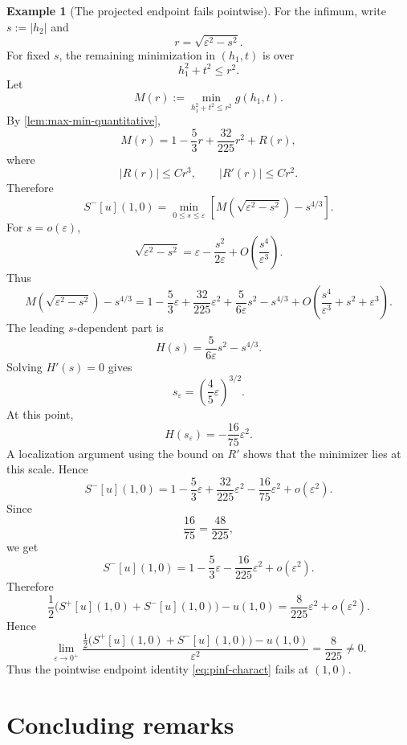 \documentclass[12pt,reqno]{amsart}
\numberwithin{equation}{section}
\theoremstyle{plain}
\theoremstyle{definition}
\newtheorem{example}[example]{Example}
\theoremstyle{remark}
\newcommand{\Sp}{S^+}
\newcommand{\Sm}{S^-}
\begin{document}
\begin{example}[The projected endpoint fails pointwise]
For the infimum, write $s:=|h_2|$ and
\[
  r=\sqrt{\varepsilon^2-s^2}.
\]
For fixed $s$, the remaining minimization in $(h_1,t)$ is over
\[
  h_1^2+t^2\le r^2.
\]
Let
\[
  M(r)
  :=
  \min_{h_1^2+t^2\le r^2}g(h_1,t).
\]
By \cref{lem:max-min-quantitative},
\[
  M(r)
  =
  1-\frac53r+\frac{32}{225}r^2+R(r),
\]
where
\[
  |R(r)|\le Cr^3,
  \qquad
  |R'(r)|\le Cr^2.
\]
Therefore
\[
  \Sm[u](1,0)
  =
  \min_{0\le s\le\varepsilon}
  \left[
    M\!\left(\sqrt{\varepsilon^2-s^2}\right)-s^{4/3}
  \right].
\]
For $s=o(\varepsilon)$,
\[
  \sqrt{\varepsilon^2-s^2}
  =
  \varepsilon-\frac{s^2}{2\varepsilon}
  +
  O\!\left(\frac{s^4}{\varepsilon^3}\right).
\]
Thus
\[
  M\!\left(\sqrt{\varepsilon^2-s^2}\right)-s^{4/3}
  =
  1-\frac53\varepsilon+\frac{32}{225}\varepsilon^2
  +
  \frac{5}{6\varepsilon}s^2
  -
  s^{4/3}
  +
  O\!\left(\frac{s^4}{\varepsilon^3}+s^2+\varepsilon^3\right).
\]
The leading $s$-dependent part is
\[
  H(s)
  =
  \frac{5}{6\varepsilon}s^2-s^{4/3}.
\]
Solving $H'(s)=0$ gives
\[
  s_\varepsilon
  =
  \left(\frac45\varepsilon\right)^{3/2}.
\]
At this point,
\[
  H(s_\varepsilon)
  =
  -\frac{16}{75}\varepsilon^2.
\]
A localization argument using the bound on $R'$ shows that the minimizer
lies at this scale. Hence
\[
  \Sm[u](1,0)
  =
  1-\frac53\varepsilon
  +
  \frac{32}{225}\varepsilon^2
  -
  \frac{16}{75}\varepsilon^2
  +
  o(\varepsilon^2).
\]
Since
\[
  \frac{16}{75}=\frac{48}{225},
\]
we get
\[
  \Sm[u](1,0)
  =
  1-\frac53\varepsilon
  -
  \frac{16}{225}\varepsilon^2
  +
  o(\varepsilon^2).
\]
Therefore
\[
  \frac12
  \bigl(\Sp[u](1,0)+\Sm[u](1,0)\bigr)
  -
  u(1,0)
  =
  \frac{8}{225}\varepsilon^2
  +
  o(\varepsilon^2).
\]
Hence
\[
  \lim_{\varepsilon\to0^+}
  \frac{
    \frac12
    \bigl(\Sp[u](1,0)+\Sm[u](1,0)\bigr)
    -
    u(1,0)
  }{\varepsilon^2}
  =
  \frac{8}{225}
  \ne0.
\]
Thus the pointwise endpoint identity \eqref{eq:pinf-charact} fails at
$(1,0)$.
\end{example}

\section{Concluding remarks}
\label{sec:concl}
\end{document}
